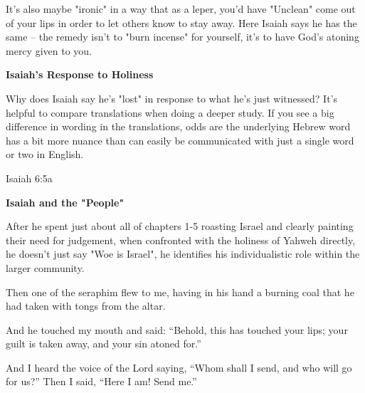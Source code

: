 \documentclass[11pt]{article}
\begin{document}
{\vspace{1em}}
It's also maybe "ironic" in a way that as a leper, you'd have "Unclean" come out of your lips in order to let others know to stay away. Here Isaiah says he has the same – the remedy isn't to "burn incense" for yourself, it's to have God's atoning mercy given to you.

{\vspace{3em}}
{\large\bfseries Isaiah's Response to Holiness}
{\vspace{1em}}

Why does Isaiah say he's "lost" in response to what he's just witnessed? It's helpful to compare translations when doing a deeper study.
If you see a big difference in wording in the translations, odds are the underlying Hebrew word has a bit more nuance than can easily be communicated with just a single word or two in English.
\begin{biblecomparison}{Isaiah 6:5a}
\end{biblecomparison}



{\vspace{3em}}
{\large\bfseries Isaiah and the "People"}
{\vspace{1em}}

After he spent just about all of chapters 1-5 roasting Israel and clearly painting their need for judgement, when confronted with the holiness of Yahweh directly, he doesn't just say "Woe is Israel", he identifies his individualistic role within the larger community.


\begin{biblicaloutline}[Isaiah 6:6-8]
    

    \begin{versesection}{2em}
         Then one of the seraphim flew to me, having in his hand a burning coal that he had taken with tongs from the altar.

         And he touched my mouth and said: ``Behold, this has touched your lips; your guilt is taken away, and your sin atoned for.''
    \end{versesection}
    
    
    \begin{versesection}{2em}
         And I heard the voice of the Lord saying, ``Whom shall I send, and who will go for us?'' Then I said, ``Here I am! Send me.''
    \end{versesection}

\end{biblicaloutline}
\end{document}
